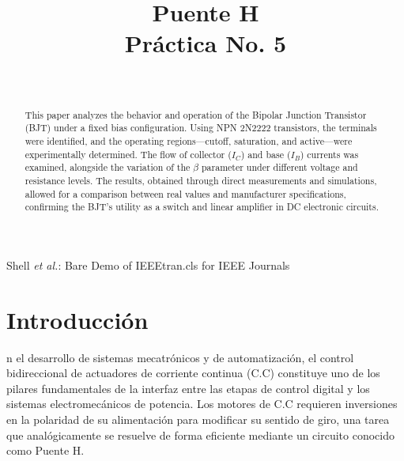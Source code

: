 \documentclass[journal]{IEEEtran}
\begin{document}
\title{Puente H\\ \small{Práctica No. 5}}

\author{
    \\
}
        
{Shell \MakeLowercase{\textit{et al.}}: Bare Demo of IEEEtran.cls for IEEE Journals}

\maketitle

\begin{abstract}
    This paper analyzes the behavior and operation of the Bipolar Junction Transistor (BJT) under a fixed bias configuration. 
    Using NPN 2N2222 transistors, the terminals were identified, and the operating regions—cutoff, saturation, and active—were experimentally determined. 
    The flow of collector ($I_C$) and base ($I_B$) currents was examined, alongside the variation of the $\beta$ parameter under different voltage and resistance levels. 
    The results, obtained through direct measurements and simulations, allowed for a comparison between real values and manufacturer specifications, confirming the 
    BJT's utility as a switch and linear amplifier in DC electronic circuits.
\end{abstract}

\section{Introducción}

    n el desarrollo de sistemas mecatrónicos y de automatización, el control bidireccional de actuadores de corriente continua (C.C) constituye uno de los pilares fundamentales de la interfaz entre las etapas de control digital y los sistemas electromecánicos de potencia. 
    Los motores de C.C requieren inversiones en la polaridad de su alimentación para modificar su sentido de giro, una tarea que analógicamente se resuelve de forma eficiente mediante un circuito conocido como Puente H. 
    
\end{document}
